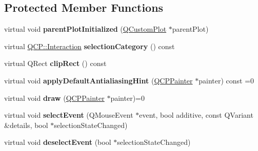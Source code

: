 \subsection*{Protected Member Functions}
\begin{DoxyCompactItemize}
\item 
virtual void {\bfseries parent\+Plot\+Initialized} (\hyperlink{class_q_custom_plot}{Q\+Custom\+Plot} $\ast$parent\+Plot)\hypertarget{class_q_c_p_layerable_ab20b7dbd8e0249ed61adb9622c427382}{}\label{class_q_c_p_layerable_ab20b7dbd8e0249ed61adb9622c427382}

\item 
virtual \hyperlink{namespace_q_c_p_a2ad6bb6281c7c2d593d4277b44c2b037}{Q\+C\+P\+::\+Interaction} {\bfseries selection\+Category} () const \hypertarget{class_q_c_p_layerable_aa4035e586b7f317a06ba7e74e242a5ea}{}\label{class_q_c_p_layerable_aa4035e586b7f317a06ba7e74e242a5ea}

\item 
virtual Q\+Rect {\bfseries clip\+Rect} () const \hypertarget{class_q_c_p_layerable_a07a8f746640c3704b09910df297afcba}{}\label{class_q_c_p_layerable_a07a8f746640c3704b09910df297afcba}

\item 
virtual void {\bfseries apply\+Default\+Antialiasing\+Hint} (\hyperlink{class_q_c_p_painter}{Q\+C\+P\+Painter} $\ast$painter) const =0\hypertarget{class_q_c_p_layerable_afdf83ddc6a265cbf4c89fe99d3d93473}{}\label{class_q_c_p_layerable_afdf83ddc6a265cbf4c89fe99d3d93473}

\item 
virtual void {\bfseries draw} (\hyperlink{class_q_c_p_painter}{Q\+C\+P\+Painter} $\ast$painter)=0\hypertarget{class_q_c_p_layerable_adf62b4bac3ca934db80290792fc897e1}{}\label{class_q_c_p_layerable_adf62b4bac3ca934db80290792fc897e1}

\item 
virtual void {\bfseries select\+Event} (Q\+Mouse\+Event $\ast$event, bool additive, const Q\+Variant \&details, bool $\ast$selection\+State\+Changed)\hypertarget{class_q_c_p_layerable_a7498c2d0d081cf7cad0fb3bb93aa0e91}{}\label{class_q_c_p_layerable_a7498c2d0d081cf7cad0fb3bb93aa0e91}

\item 
virtual void {\bfseries deselect\+Event} (bool $\ast$selection\+State\+Changed)\hypertarget{class_q_c_p_layerable_ae546370644a5551c76af739afc008bee}{}\label{class_q_c_p_layerable_ae546370644a5551c76af739afc008bee}


\end{DoxyCompactItemize}
